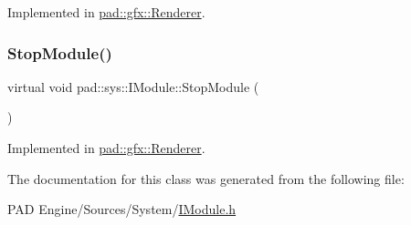 Implemented in \mbox{\hyperlink{classpad_1_1gfx_1_1_renderer_af78164b0fc174776bf1345c99d5c08b4}{pad\+::gfx\+::\+Renderer}}.

\mbox{\label{classpad_1_1sys_1_1_i_module_aa6c2b9d1e6b66aeee291923d4be87f0c}} 
\subsubsection{\texorpdfstring{Stop\+Module()}{StopModule()}}
{\footnotesize\ttfamily virtual void pad\+::sys\+::\+I\+Module\+::\+Stop\+Module (\begin{DoxyParamCaption}{ }\end{DoxyParamCaption})\hspace{0.3cm}{\ttfamily [pure virtual]}}



Implemented in \mbox{\hyperlink{classpad_1_1gfx_1_1_renderer_ad90dc994132b8f4028eaa5b9af87b601}{pad\+::gfx\+::\+Renderer}}.



The documentation for this class was generated from the following file\+:\begin{DoxyCompactItemize}
\item 
P\+A\+D Engine/\+Sources/\+System/\mbox{\hyperlink{_i_module_8h}{I\+Module.\+h}}\end{DoxyCompactItemize}
